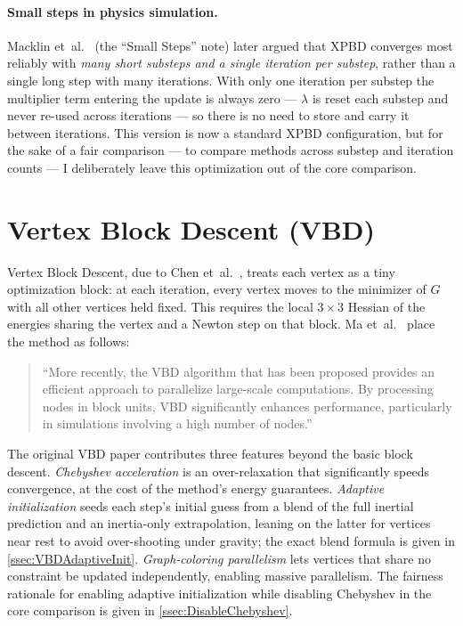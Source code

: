 \paragraph{Small steps in physics simulation.}
Macklin et~al.~\cite{Macklin2019SmallSI} (the ``Small Steps'' note) later argued
that XPBD converges most reliably with \emph{many short substeps and a single
iteration per substep}, rather than a single long step with many iterations. With only one iteration per
substep the multiplier term entering the update is always zero --- $\lambda$ is
reset each substep and never re-used across iterations --- so there is no need to
store and carry it between iterations. This version is now a standard XPBD configuration, but
for the sake of a fair comparison --- to compare methods across substep and iteration counts --- I deliberately leave this optimization out of
the core comparison.

\section{Vertex Block Descent (VBD)}
\label{sec:VBDLineage}
Vertex Block Descent, due to Chen et~al.~\cite{Chen2024}, treats each vertex as a
tiny optimization block: at each iteration, every vertex moves to the minimizer of
$G$ with all other vertices held fixed. This requires the local $3\times 3$
Hessian of the energies sharing the vertex and a Newton step on that block. Ma
et~al.~\cite{app142311072} place the method as follows:

\begin{quote}
``More recently, the VBD algorithm that has been proposed provides an efficient
approach to parallelize large-scale computations. By processing nodes in block
units, VBD significantly enhances performance, particularly in simulations
involving a high number of nodes.''
\end{quote}

The original VBD paper contributes three features beyond the basic block descent.
\emph{Chebyshev acceleration} is an over-relaxation that significantly speeds
convergence, at the cost of the method's energy guarantees. \emph{Adaptive
initialization} seeds each step's initial guess from a blend of the full inertial
prediction and an inertia-only extrapolation, leaning on the latter for vertices
near rest to avoid over-shooting under gravity; the exact blend formula is given
in \autoref{ssec:VBDAdaptiveInit}. \emph{Graph-coloring parallelism} lets
vertices that share no constraint be updated independently, enabling massive
parallelism. The fairness rationale for enabling adaptive initialization while
disabling Chebyshev in the core comparison is given in
\autoref{ssec:DisableChebyshev}.

